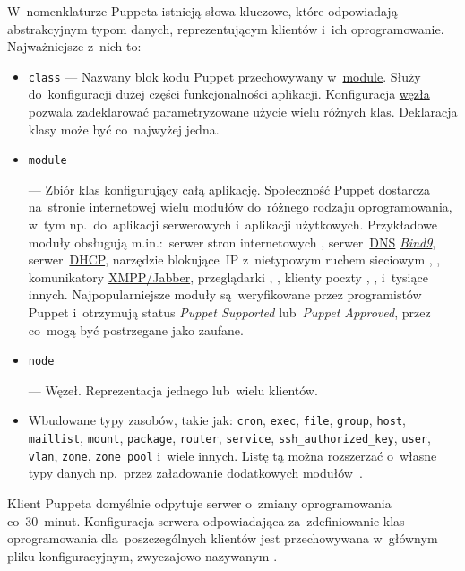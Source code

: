 \documentclass[thesis]{subfiles}
\begin{document}
W~nomenklaturze Puppeta istnieją słowa kluczowe, które odpowiadają abstrakcyjnym typom danych, reprezentującym klientów i~ich oprogramowanie. Najważniejsze z~nich to:\mynobreakpar
\begin{itemize}
\item \texttt{class} --- Nazwany blok kodu Puppet przechowywany w~\hyperlink{itm:puppetmodule}{module}. Służy do~konfiguracji dużej części funkcjonalności aplikacji. Konfiguracja \hyperlink{itm:puppetnode}{węzła} pozwala zadeklarować parametryzowane użycie wielu różnych klas. Deklaracja klasy może być co~najwyżej jedna.
\item \hypertarget{itm:puppetmodule}{\texttt{module}} --- Zbiór klas konfigurujący całą aplikację. Społeczność Puppet dostarcza na~stronie internetowej  wielu modułów do~różnego rodzaju oprogramowania, w~tym np.~do~aplikacji serwerowych i~aplikacji użytkowych. Przykładowe moduły obsługują m.in.:~serwer stron internetowych , serwer~\href{https://en.wikipedia.org/wiki/Domain_Name_System}{DNS} \emph{\href{https://forge.puppet.com/ajjahn/dns}{Bind9}}, serwer~\href{https://forge.puppet.com/theforeman/dhcp}{DHCP}, narzędzie blokujące~IP z~nietypowym ruchem sieciowym , , komunikatory \href{https://forge.puppet.com/jamtur01/xmpp}{XMPP/Jabber}, przeglądarki , , klienty poczty , , i~tysiące innych. Najpopularniejsze moduły są~weryfikowane przez programistów Puppet i~otrzymują status \emph{Puppet Supported} lub~\emph{Puppet Approved}, przez co~mogą być postrzegane jako zaufane.
\item \hypertarget{itm:puppetnode}{\texttt{node}} --- Węzeł. Reprezentacja jednego lub~wielu klientów.
\item Wbudowane typy zasobów, takie jak: \texttt{cron}, \texttt{exec}, \texttt{file}, \texttt{group}, \texttt{host}, \texttt{maillist}, \texttt{mount}, \texttt{package}, \texttt{router}, \texttt{service}, \texttt{ssh\_authorized\_key}, \texttt{user}, \texttt{vlan}, \texttt{zone}, \texttt{zone\_pool} i~wiele innych. Listę tą można rozszerzać o~własne typy danych np.~przez załadowanie dodatkowych modułów~\cite{puppet-resources-types}.
\end{itemize}
Klient Puppeta domyślnie odpytuje serwer o~zmiany oprogramowania co~30~minut. Konfiguracja serwera odpowiadająca za~zdefiniowanie klas oprogramowania dla~poszczególnych klientów jest przechowywana w~głównym pliku konfiguracyjnym, zwyczajowo nazywanym \href{https://docs.puppet.com/puppet/latest/dirs_manifest.html#directories:-the-main-manifest(s)}{}.
\end{document}
